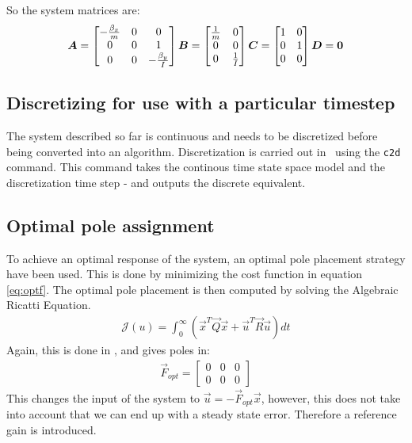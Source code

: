 So the system matrices are:
\[
\vec{A} =\begin{bmatrix}
 -\frac{\beta_{x}}{m} & 0 & 0\\
 0 & 0 & 1\\
 0 & 0 & - \frac{\beta_{y}}{I}\\
\end{bmatrix}\\
\vec{B} = \begin{bmatrix}
\frac{1}{m} & 0\\
0 & 0\\
0 & \frac{1}{I}\\
\end{bmatrix}\\
\vec{C} = 
\begin{bmatrix}
1 & 0\\
0 & 1\\
0 & 0
\end{bmatrix}\\
\vec{D} = \vec{0}
\]

\subsection{Discretizing for use with a particular timestep}

The system described so far is continuous and needs to be discretized before being converted into an algorithm. Discretization is carried out in \MATLAB \ using the \texttt{c2d} command. This command takes the continous time state space model and the discretization time step - and outputs the discrete equivalent. 

\subsection{Optimal pole assignment}
To achieve an optimal response of the system, an optimal pole placement strategy have been used. This is done by minimizing the cost function in equation \vref{eq:optf}. The optimal pole placement is then computed by solving the Algebraic Ricatti Equation. 
\begin{align}
\mathcal{J}(u)=\int_{0}^{\infty} (\vec{x}^T \vec{Q} \vec{x} + \vec{u}^T \vec{R} \vec{u}) dt
\label{eq:optf}
\end{align}
Again, this is done in \MATLAB, and gives poles in:
\begin{align}
\vec{F}_{opt} = \begin{bmatrix}
0 & 0 & 0\\
0 & 0 & 0
\end{bmatrix}
\end{align}
This changes the input of the system to $\vec{u} = -\vec{F}_{opt}\vec{x}$, however, this does not take into account that we can end up with a steady state error. Therefore a reference gain is introduced. 


